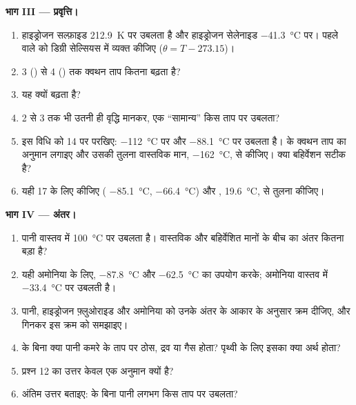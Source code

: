 \begin{problem}
\medskip
\noindent\textbf{भाग III --- प्रवृत्ति।}
\begin{enumerate}[resume]
  \item हाइड्रोजन सल्फ़ाइड \qty{212.9}{K} पर उबलता है और हाइड्रोजन सेलेनाइड
        \qty{-41.3}{\celsius} पर। पहले वाले को डिग्री सेल्सियस में व्यक्त कीजिए
        ($\theta = T - 273.15$)।
  \item {} 3 () से  4 () तक क्वथन ताप कितना
        बढ़ता है?
  \item यह क्यों बढ़ता है?
  \item {} 2 से  3 तक भी उतनी ही वृद्धि मानकर, एक ``सामान्य'' 
        किस ताप पर उबलता?
  \item इस विधि को  14 पर परखिए:  \qty{-112}{\celsius} पर
        और  \qty{-88.1}{\celsius} पर उबलता है।
         के क्वथन ताप का अनुमान लगाइए और उसकी तुलना वास्तविक मान,
        \qty{-162}{\celsius}, से कीजिए। क्या बहिर्वेशन सटीक है?
  \item यही  17 के लिए कीजिए ( \qty{-85.1}{\celsius},
         \qty{-66.4}{\celsius}) और ,
        \qty{19.6}{\celsius}, से तुलना कीजिए।
\end{enumerate}

\medskip
\noindent\textbf{भाग IV --- अंतर।}
\begin{enumerate}[resume]
  \item पानी वास्तव में \qty{100}{\celsius} पर उबलता है। वास्तविक और बहिर्वेशित
        मानों के बीच का अंतर कितना बड़ा है?
  \item यही अमोनिया के लिए,  \qty{-87.8}{\celsius} और
         \qty{-62.5}{\celsius} का उपयोग करके; अमोनिया वास्तव में
        \qty{-33.4}{\celsius} पर उबलती है।
  \item पानी, हाइड्रोजन फ़्लुओराइड और अमोनिया को उनके अंतर के आकार के अनुसार
        क्रम दीजिए, और  गिनकर इस क्रम को समझाइए।
  \item {} के बिना क्या पानी कमरे के ताप पर ठोस, द्रव या गैस
        होता? पृथ्वी के लिए इसका क्या अर्थ होता?
  \item प्रश्न 12 का उत्तर केवल एक अनुमान क्यों है?
  \item अंतिम उत्तर बताइए:  के बिना पानी लगभग किस ताप पर
        उबलता?
\end{enumerate}
\end{problem}
